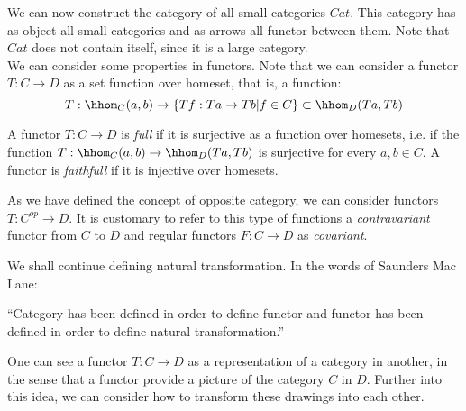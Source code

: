We can now construct the category of all small categories $Cat$. This category has as object all small categories and as arrows all functor between them. Note that $Cat$ does not contain itself, since it is a large category.\\

We can consider some properties in functors. Note that we can consider a functor $T:C\to D$ as a set function over homeset, that is, a function: 
$$T:\hhom_C(a,b) \to \{Tf: Ta \to Tb | f \in C\} \subset \hhom_D(Ta,Tb)$$

\begin{definition}
  A functor $T:C\to D$ is \emph{full} if it is surjective as a function over homesets, i.e. if the function $T:\hhom_C(a,b) \to  \hhom_D(Ta,Tb)$  is surjective for every $a,b \in C$. A functor is \emph{faithfull} if it is injective over homesets.
\end{definition}

As we have defined the concept of opposite category, we can consider functors $T:C^{op} \to D$. It is customary to refer to this type of functions a \emph{contravariant} functor from $C$ to $D$ and regular functors $F:C\to D$ as \emph{covariant}.





We shall continue defining natural transformation. In the words of Saunders Mac Lane:

\begin{displayquote}
  ``Category has been defined in order to define functor and functor has been defined in order to define natural transformation.''
\end{displayquote}




One can see a functor $T:C\to D$ as a representation of a category in another, in the sense that a functor provide a picture of the category $C$ in $D$. Further into this idea, we can consider how to transform these drawings into each other. 

